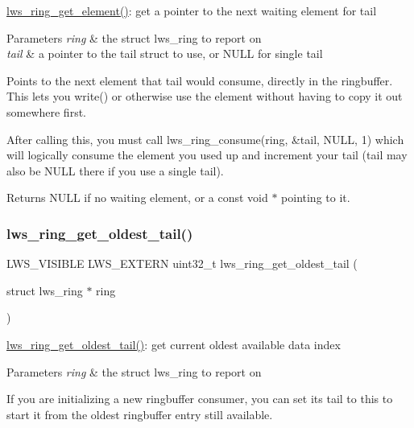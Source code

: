 \hyperlink{group__lws__ring_ga4bc75cf61aed9737f54bef9b79b54e58}{lws\+\_\+ring\+\_\+get\+\_\+element()}\+: get a pointer to the next waiting element for tail


\begin{DoxyParams}{Parameters}
{\em ring} & the struct lws\+\_\+ring to report on \\
\hline
{\em tail} & a pointer to the tail struct to use, or N\+U\+LL for single tail\\
\hline
\end{DoxyParams}
Points to the next element that tail would consume, directly in the ringbuffer. This lets you write() or otherwise use the element without having to copy it out somewhere first.

After calling this, you must call lws\+\_\+ring\+\_\+consume(ring, \&tail, N\+U\+L\+L, 1) which will logically consume the element you used up and increment your tail (tail may also be N\+U\+LL there if you use a single tail).

Returns N\+U\+LL if no waiting element, or a const void $\ast$ pointing to it. \mbox{\label{group__lws__ring_ga410b651d0668809dcf6e3621edce2794}} 
\subsubsection{\texorpdfstring{lws\+\_\+ring\+\_\+get\+\_\+oldest\+\_\+tail()}{lws\_ring\_get\_oldest\_tail()}}
{\footnotesize\ttfamily L\+W\+S\+\_\+\+V\+I\+S\+I\+B\+LE L\+W\+S\+\_\+\+E\+X\+T\+E\+RN uint32\+\_\+t lws\+\_\+ring\+\_\+get\+\_\+oldest\+\_\+tail (\begin{DoxyParamCaption}\item[{struct lws\+\_\+ring $\ast$}]{ring }\end{DoxyParamCaption})}

\hyperlink{group__lws__ring_ga410b651d0668809dcf6e3621edce2794}{lws\+\_\+ring\+\_\+get\+\_\+oldest\+\_\+tail()}\+: get current oldest available data index


\begin{DoxyParams}{Parameters}
{\em ring} & the struct lws\+\_\+ring to report on\\
\hline
\end{DoxyParams}
If you are initializing a new ringbuffer consumer, you can set its tail to this to start it from the oldest ringbuffer entry still available. \mbox{\label{group__lws__ring_ga00fcaf9c2e3b16e9a667120ae214cc30}} 
